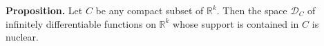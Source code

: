 \textbf{Proposition.} Let $C$ be any compact subset of $\mathbb{R}^k$. Then the space $\mathcal{D}_C$ of infinitely differentiable functions on $\mathbb{R}^k$ whose support is contained in $C$ is nuclear.
